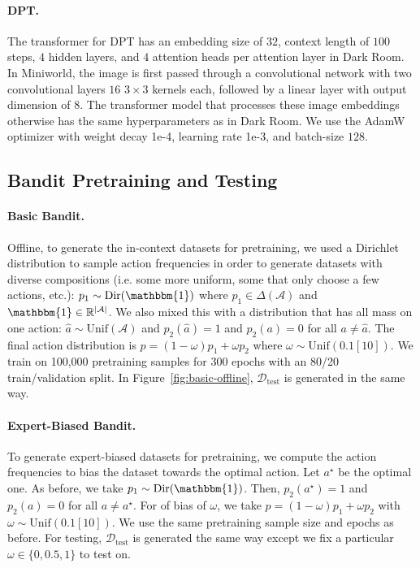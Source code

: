 \documentclass{article}
\newcommand{\Acal}{\mathcal{A}}
\newcommand{\Dcal}{\mathcal{D}}
\newcommand{\RR}{\mathbb{R}}
\newcommand*{\one}{{\mathbbm{1}}}
\newcommand{\testd}{\Dcal_{\text{test}}}
\newcommand{\macroName}{DPT}
\newcommand{\unif}{\text{Unif}}
\begin{document}
\paragraph{\macroName{}.} The transformer for \macroName{} has an embedding size of $32$, context length of $100$ steps, $4$ hidden layers, and $4$ attention heads per attention layer in Dark Room. In Miniworld, the image is first passed through a convolutional network with two convolutional layers $16$ $3 \times 3$ kernels each, followed by a linear layer with output dimension of $8$. The transformer model that processes these image embeddings otherwise has the same hyperparameters as in Dark Room. We use the AdamW optimizer with weight decay 1e-4, learning rate 1e-3, and batch-size $128$.
\subsection{Bandit Pretraining and Testing}
\label{app:bandit-pretrain-data}
\paragraph{Basic Bandit. }
Offline, to generate the in-context datasets for pretraining, we used a Dirichlet distribution to sample action frequencies in order to generate datasets with diverse compositions (i.e. some more uniform, some that only choose a few actions, etc.):
$p_1 \sim \text{Dir}(\one)$
where $p_1 \in \Delta(\Acal)$ and $\one \in \RR^{|\Acal|}$. We also mixed this with a distribution that has all mass on one action: $\hat a \sim \unif(\Acal)$ and $p_2(\hat a) = 1$ and $p_2(a) = 0$ for all $a \neq \hat a$. The final action distribution is $p = (1 - \omega)  p_1 + \omega p_2$ where $\omega \sim \unif(0.1 [10])$.  We train on 100,000 pretraining samples for 300 epochs with an 80/20 train/validation split. In Figure~\ref{fig:basic-offline}, $\testd$ is generated in the same way.
\paragraph{Expert-Biased Bandit.} To generate expert-biased datasets for pretraining, we compute the action frequencies to bias the dataset towards the optimal action. Let $a^\star$ be the optimal one. As before, we take $p_1 \sim \text{Dir}(\one)$. Then, $p_2(a^\star) = 1$ and $p_2(a) = 0$ for all $a \neq a^\star$. For of bias of $\omega$, we take $p = (1 - \omega) p_1 + \omega p_2$ with $\omega \sim \unif(0.1 [10])$. We use the same pretraining sample size and epochs as before. For testing, $\testd$ is generated the same way except we fix a particular $\omega \in \{0, 0.5, 1\}$ to test on.
\end{document}
